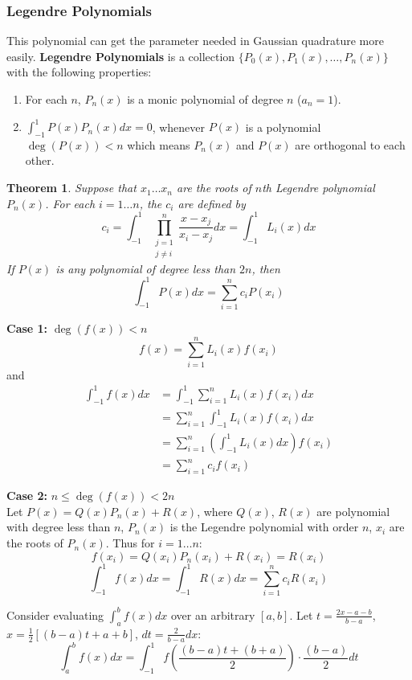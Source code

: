 \documentclass[12pt, a4paper]{article}
\makeatletter
\theoremstyle{break}
\newtheorem{theorem}{Theorem}[section]
\renewenvironment{proof}[1][\proofname]{\par
  \pushQED{\qed}%
  \normalfont \topsep6\p@\@plus6\p@\relax
  \trivlist
  \item[\hskip\labelsep\bfseries #1\@addpunct{.}]\mbox{}\newline\ignorespaces
}{%
  \popQED\endtrivlist\@endpefalse
}
\makeatother
\begin{document}
\subsubsection*{Legendre Polynomials}
This polynomial can get the parameter needed in Gaussian quadrature more easily. \textbf{Legendre Polynomials} is a collection $\{P_0(x), P_1(x), \dots, P_n(x)\}$ with the following properties:
\begin{enumerate}
    \item For each $n$, $P_n(x)$ is a monic polynomial of degree $n$ ($a_n = 1$).
    \item $\int_{-1}^1 P(x) P_n(x) dx = 0$, whenever $P(x)$ is a polynomial $\deg(P(x)) < n$ which means $P_n(x)$ and $P(x)$ are orthogonal to each other.
\end{enumerate}

\begin{theorem}
Suppose that $x_1 \dots x_n$ are the roots of $n$th Legendre polynomial $P_n(x)$. For each $i=1\dots n$, the $c_i$ are defined by
\[ c_i = \int_{-1}^1 \prod_{\substack{j=1 \\ j \neq i}}^n \frac{x-x_j}{x_i-x_j} dx = \int_{-1}^1 L_i(x) dx \]
If $P(x)$ is any polynomial of degree less than $2n$, then
\[ \int_{-1}^1 P(x) dx = \sum_{i=1}^n c_i P(x_i) \]
\end{theorem}
\begin{proof}
\textbf{Case 1:} $\deg(f(x)) < n$
\[ f(x) = \sum_{i=1}^n L_i(x) f(x_i) \]
and
\begin{align*}
\int_{-1}^1 f(x) dx &= \int_{-1}^1 \sum_{i=1}^n L_i(x) f(x_i) dx \\
&= \sum_{i=1}^n \int_{-1}^1 L_i(x) f(x_i) dx \\
&= \sum_{i=1}^n \left( \int_{-1}^1 L_i(x) dx \right) f(x_i) \\
&= \sum_{i=1}^n c_i f(x_i)
\end{align*}

\textbf{Case 2:} $n \le \deg(f(x)) < 2n$ \\
Let $P(x) = Q(x)P_n(x) + R(x)$, where $Q(x)$, $R(x)$ are polynomial with degree less than $n$, $P_n(x)$ is the Legendre polynomial with order $n$, $x_i$ are the roots of $P_n(x)$. Thus for $i=1\dots n$:
\[ f(x_i) = Q(x_i)P_n(x_i) + R(x_i) = R(x_i) \]
\[ \int_{-1}^1 f(x) dx = \int_{-1}^1 R(x) dx = \sum_{i=1}^n c_i R(x_i) \]
\end{proof}

Consider evaluating $\int_a^b f(x) dx$ over an arbitrary $[a,b]$.
Let $t = \frac{2x-a-b}{b-a}$, $x = \frac{1}{2}[(b-a)t + a + b]$, $dt = \frac{2}{b-a} dx$:
\[ \int_a^b f(x) dx = \int_{-1}^1 f\left(\frac{(b-a)t + (b+a)}{2}\right) \cdot \frac{(b-a)}{2} dt \]
\end{document}
